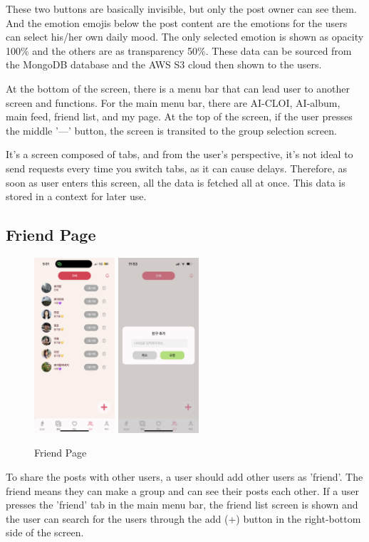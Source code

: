         These two buttons are basically invisible, but only the post owner can see them. And the emotion emojis below the post content are the emotions for the users can select his/her own daily mood. The only selected emotion is shown as opacity 100\% and the others are as transparency 50\%. These data can be sourced from the MongoDB database and the AWS S3 cloud then shown to the users.

        At the bottom of the screen, there is a menu bar that can lead user to another screen and functions. For the main menu bar, there are AI-CLOI, AI-album, main feed, friend list, and my page. At the top of the screen, if the user presses the middle '—' button, the screen is transited to the group selection screen.

        It's a screen composed of tabs, and from the user's perspective, it's not ideal to send requests every time you switch tabs, as it can cause delays. Therefore, as soon as user enters this screen, all the data is fetched all at once. This data is stored in a context for later use.

    \subsection{Friend Page}
        \begin{figure}[htbp]
            \centerline{
            \includegraphics[width=3cm]{Images/page/friends.png}
            \includegraphics[width=3cm]{Images/page/addFriend.jpg}}
            \caption{Friend Page}
            \label{fig}
        \end{figure}
        To share the posts with other users, a user should add other users as 'friend'. The friend means they can make a group and can see their posts each other. If a user presses the 'friend' tab in the main menu bar, the friend list screen is shown and the user can search for the users through the add (+) button in the right-bottom side of the screen.

